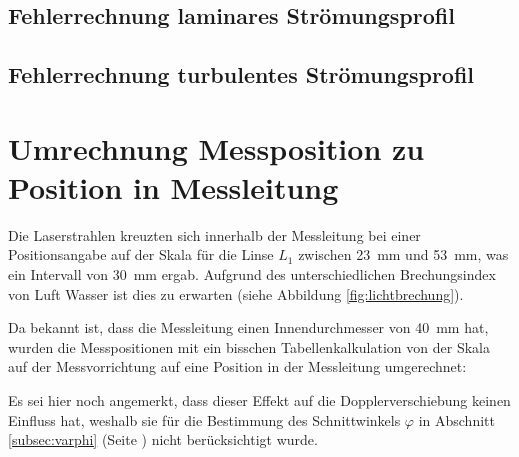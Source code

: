 \clearpage
\subsection{Fehlerrechnung laminares Str\"omungsprofil}
\label{app:python:errorLaminar}


\clearpage
\subsection{Fehlerrechnung turbulentes Str\"omungsprofil}
\label{app:python:errorTurbulent}



\clearpage
\section{Umrechnung Messposition zu Position in Messleitung}
\label{app:messposition}

Die  Laserstrahlen   kreuzten  sich   innerhalb  der  Messleitung   bei  einer
Positionsangabe   auf    der   Skala   f\"ur   die    Linse   $L_1$   zwischen
\SI{23}{\milli\meter}   und  \SI{53}{\milli\meter},   was  ein  Intervall  von
\SI{30}{\milli\meter} ergab. Aufgrund des unterschiedlichen Brechungsindex von
Luft Wasser ist dies zu erwarten (siehe Abbildung \ref{fig:lichtbrechung}).

Da   bekannt   ist,   dass   die  Messleitung   einen   Innendurchmesser   von
\SI{40}{\milli\meter}  hat,   wurden  die  Messpositionen  mit   ein  bisschen
Tabellenkalkulation von der Skala auf der Messvorrichtung auf eine Position in
der Messleitung umgerechnet:


Es sei  hier noch  angemerkt, dass dieser  Effekt auf  die Dopplerverschiebung
keinen  Einfluss hat,  weshalb  sie f\"ur  die  Bestimmung des  Schnittwinkels
$\varphi$  in  Abschnitt \ref{subsec:varphi}  (Seite  \pageref{subsec:varphi})
nicht ber\"ucksichtigt wurde.

